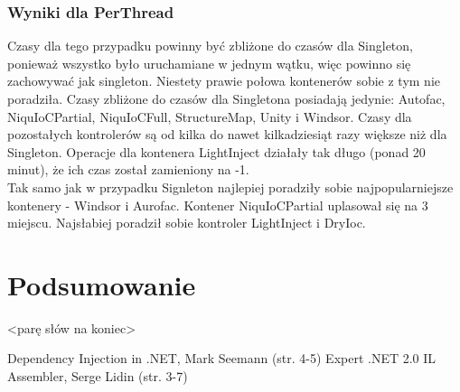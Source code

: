 \documentclass[12pt]{article}
\begin{document}
\subsubsection{Wyniki dla PerThread}
Czasy dla tego przypadku powinny być zbliżone do czasów dla Singleton, ponieważ wszystko było uruchamiane w jednym wątku, więc powinno się zachowywać jak singleton. Niestety prawie połowa kontenerów sobie z tym nie poradziła. Czasy zbliżone do czasów dla Singletona posiadają jedynie: Autofac, NiquIoCPartial, NiquIoCFull, StructureMap, Unity i Windsor. Czasy dla pozostałych kontrolerów są od kilka do nawet kilkadziesiąt razy większe niż dla Singleton. Operacje dla kontenera LightInject działały tak długo (ponad 20 minut), że ich czas został zamieniony na -1.\\
Tak samo jak w przypadku Signleton najlepiej poradziły sobie najpopularniejsze kontenery - Windsor i Aurofac. Kontener NiquIoCPartial uplasował się na 3 miejscu. Najsłabiej poradził sobie kontroler LightInject i DryIoc.



\section{Podsumowanie}
<parę słów na koniec>

\newpage
\begin{thebibliography}{authordate1}
 Dependency Injection in .NET, Mark Seemann (str. 4-5)
 Expert .NET 2.0 IL Assembler, Serge Lidin (str. 3-7)
\end{thebibliography}
\end{document}
